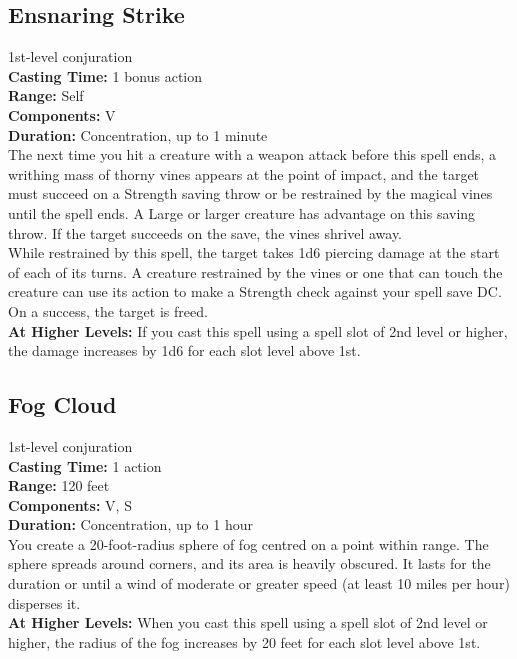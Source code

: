 \documentclass[11pt, A4paper, english]{article}
\begin{document}
		\subsection{Ensnaring Strike}
1st-level conjuration \\
\textbf{Casting Time:} 1 bonus action \\
\textbf{Range:} Self \\
\textbf{Components:} V \\
\textbf{Duration:} Concentration, up to 1 minute \\
The next time you hit a creature with a weapon attack before this spell ends, a writhing mass of thorny vines appears at the point of impact, and the target must succeed on a Strength saving throw or be restrained by the magical vines until the spell ends. A Large or larger creature has advantage on this saving throw. If the target succeeds on the save, the vines shrivel away. \\
While restrained by this spell, the target takes 1d6 piercing damage at the start of each of its turns. A creature restrained by the vines or one that can touch the creature can use its action to make a Strength check against your spell save DC. On a success, the target is freed. \\
\textbf{At Higher Levels:} If you cast this spell using a spell slot of 2nd level or higher, the damage increases by 1d6 for each slot level above 1st.

		\subsection{Fog Cloud}
1st-level conjuration \\
\textbf{Casting Time:} 1 action \\
\textbf{Range:} 120 feet \\
\textbf{Components:} V, S \\
\textbf{Duration:} Concentration, up to 1 hour \\
You create a 20-foot-radius sphere of fog centred on a point within range. The sphere spreads around corners, and its area is heavily obscured. It lasts for the duration or until a wind of moderate or greater speed (at least 10 miles per hour) disperses it. \\
\textbf{At Higher Levels:} When you cast this spell using a spell slot of 2nd level or higher, the radius of the fog increases by 20 feet for each slot level above  1st.
\end{document}
